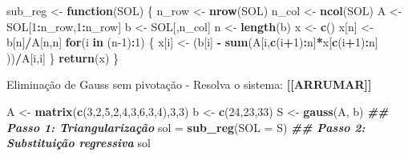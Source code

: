\documentclass[
]{article}
\newenvironment{Shaded}{\begin{snugshade}}{\end{snugshade}}
\newcommand{\AttributeTok}[1]{\textcolor[rgb]{0.13,0.29,0.53}{#1}}
\newcommand{\ControlFlowTok}[1]{\textcolor[rgb]{0.13,0.29,0.53}{\textbf{#1}}}
\newcommand{\DecValTok}[1]{\textcolor[rgb]{0.00,0.00,0.81}{#1}}
\newcommand{\DocumentationTok}[1]{\textcolor[rgb]{0.56,0.35,0.01}{\textbf{\textit{#1}}}}
\newcommand{\FunctionTok}[1]{\textcolor[rgb]{0.13,0.29,0.53}{\textbf{#1}}}
\newcommand{\NormalTok}[1]{#1}
\newcommand{\OtherTok}[1]{\textcolor[rgb]{0.56,0.35,0.01}{#1}}
\newcommand{\SpecialCharTok}[1]{\textcolor[rgb]{0.81,0.36,0.00}{\textbf{#1}}}
\begin{document}
\begin{Shaded}
\begin{Highlighting}[]
\NormalTok{sub\_reg }\OtherTok{\textless{}{-}} \ControlFlowTok{function}\NormalTok{(SOL) \{}
\NormalTok{n\_row }\OtherTok{\textless{}{-}} \FunctionTok{nrow}\NormalTok{(SOL)}
\NormalTok{n\_col }\OtherTok{\textless{}{-}} \FunctionTok{ncol}\NormalTok{(SOL)}
\NormalTok{A }\OtherTok{\textless{}{-}}\NormalTok{ SOL[}\DecValTok{1}\SpecialCharTok{:}\NormalTok{n\_row,}\DecValTok{1}\SpecialCharTok{:}\NormalTok{n\_row]}
\NormalTok{b }\OtherTok{\textless{}{-}}\NormalTok{ SOL[,n\_col]}
\NormalTok{n }\OtherTok{\textless{}{-}} \FunctionTok{length}\NormalTok{(b)}
\NormalTok{x }\OtherTok{\textless{}{-}} \FunctionTok{c}\NormalTok{()}
\NormalTok{x[n] }\OtherTok{\textless{}{-}}\NormalTok{ b[n]}\SpecialCharTok{/}\NormalTok{A[n,n]}
\ControlFlowTok{for}\NormalTok{(i }\ControlFlowTok{in}\NormalTok{ (n}\DecValTok{{-}1}\NormalTok{)}\SpecialCharTok{:}\DecValTok{1}\NormalTok{) \{}
\NormalTok{x[i] }\OtherTok{\textless{}{-}}\NormalTok{ (b[i] }\SpecialCharTok{{-}} \FunctionTok{sum}\NormalTok{(A[i,}\FunctionTok{c}\NormalTok{(i}\SpecialCharTok{+}\DecValTok{1}\NormalTok{)}\SpecialCharTok{:}\NormalTok{n]}\SpecialCharTok{*}\NormalTok{x[}\FunctionTok{c}\NormalTok{(i}\SpecialCharTok{+}\DecValTok{1}\NormalTok{)}\SpecialCharTok{:}\NormalTok{n] ))}\SpecialCharTok{/}\NormalTok{A[i,i]}
\NormalTok{\}}
\FunctionTok{return}\NormalTok{(x)}
\NormalTok{\}}
\end{Highlighting}
\end{Shaded}

Eliminação de Gauss sem pivotação - Resolva o sistema:
\textbf{{[}{[}ARRUMAR{]}{]}}

\begin{Shaded}
\begin{Highlighting}[]
\NormalTok{A }\OtherTok{\textless{}{-}} \FunctionTok{matrix}\NormalTok{(}\FunctionTok{c}\NormalTok{(}\DecValTok{3}\NormalTok{,}\DecValTok{2}\NormalTok{,}\DecValTok{5}\NormalTok{,}\DecValTok{2}\NormalTok{,}\DecValTok{4}\NormalTok{,}\DecValTok{3}\NormalTok{,}\DecValTok{6}\NormalTok{,}\DecValTok{3}\NormalTok{,}\DecValTok{4}\NormalTok{),}\DecValTok{3}\NormalTok{,}\DecValTok{3}\NormalTok{)}
\NormalTok{b }\OtherTok{\textless{}{-}} \FunctionTok{c}\NormalTok{(}\DecValTok{24}\NormalTok{,}\DecValTok{23}\NormalTok{,}\DecValTok{33}\NormalTok{)}
\NormalTok{S }\OtherTok{\textless{}{-}} \FunctionTok{gauss}\NormalTok{(A, b) }\DocumentationTok{\#\# Passo 1: Triangularização}
\NormalTok{sol }\OtherTok{=} \FunctionTok{sub\_reg}\NormalTok{(}\AttributeTok{SOL =}\NormalTok{ S) }\DocumentationTok{\#\# Passo 2: Substituição regressiva}
\NormalTok{sol}
\end{Highlighting}
\end{Shaded}
\end{document}
